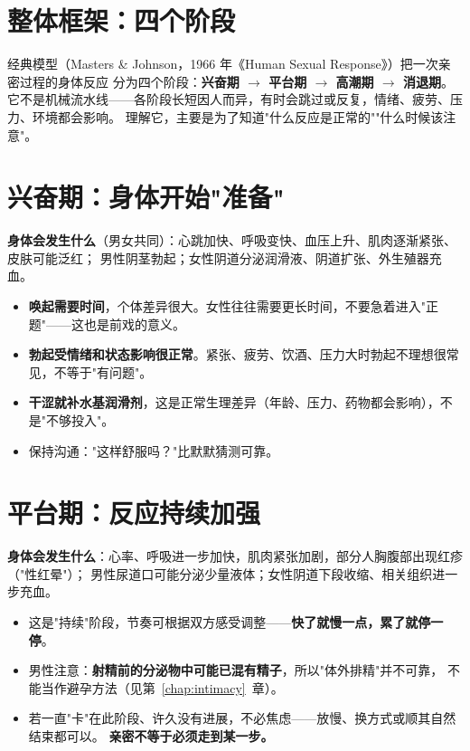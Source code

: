 \section{整体框架：四个阶段}

经典模型（Masters \& Johnson，1966 年《Human Sexual Response》）把一次亲密过程的身体反应
分为四个阶段：\textbf{兴奋期 $\to$ 平台期 $\to$ 高潮期 $\to$ 消退期}。
它不是机械流水线——各阶段长短因人而异，有时会跳过或反复，情绪、疲劳、压力、环境都会影响。
理解它，主要是为了知道"什么反应是正常的""什么时候该注意"。

\section{兴奋期：身体开始"准备"}

\textbf{身体会发生什么}（男女共同）：心跳加快、呼吸变快、血压上升、肌肉逐渐紧张、皮肤可能泛红；
男性阴茎勃起；女性阴道分泌润滑液、阴道扩张、外生殖器充血。

\begin{itemize}[leftmargin=2em]
  \item \textbf{唤起需要时间}，个体差异很大。女性往往需要更长时间，不要急着进入"正题"——这也是前戏的意义。
  \item \textbf{勃起受情绪和状态影响很正常}。紧张、疲劳、饮酒、压力大时勃起不理想很常见，不等于"有问题"。
  \item \textbf{干涩就补水基润滑剂}，这是正常生理差异（年龄、压力、药物都会影响），不是"不够投入"。
  \item 保持沟通："这样舒服吗？"比默默猜测可靠。
\end{itemize}

\section{平台期：反应持续加强}

\textbf{身体会发生什么}：心率、呼吸进一步加快，肌肉紧张加剧，部分人胸腹部出现红疹（"性红晕"）；
男性尿道口可能分泌少量液体；女性阴道下段收缩、相关组织进一步充血。

\begin{itemize}[leftmargin=2em]
  \item 这是"持续"阶段，节奏可根据双方感受调整——\textbf{快了就慢一点，累了就停一停}。
  \item 男性注意：\textbf{射精前的分泌物中可能已混有精子}，所以"体外排精"并不可靠，
        不能当作避孕方法（见第~\ref{chap:intimacy}~章）。
  \item 若一直"卡"在此阶段、许久没有进展，不必焦虑——放慢、换方式或顺其自然结束都可以。
        \textbf{亲密不等于必须走到某一步。}
\end{itemize}

